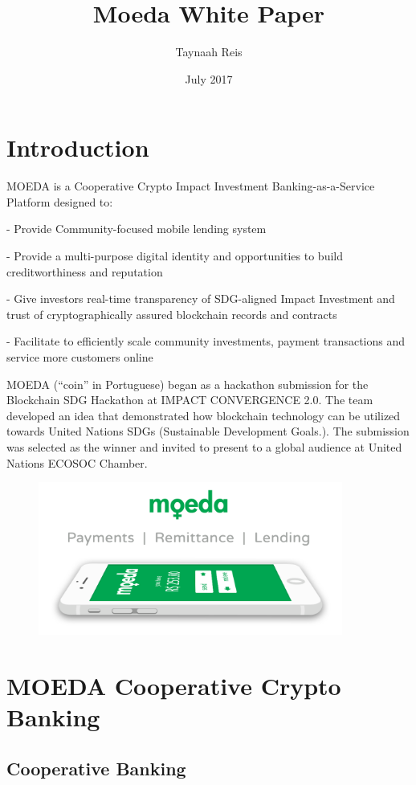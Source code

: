 \documentclass{article}
\title{Moeda White Paper}
\author{Taynaah Reis}
\date{July 2017}
\begin{document}
\maketitle

\section{Introduction}

MOEDA is a Cooperative Crypto Impact Investment Banking-as-a-Service Platform designed to:

- Provide Community-focused mobile lending system

- Provide a multi-purpose digital identity and opportunities to build creditworthiness and reputation

- Give investors real-time transparency of SDG-aligned Impact Investment and trust of cryptographically assured blockchain records and contracts

- Facilitate to efficiently scale community investments, payment transactions and service more customers online

MOEDA (“coin” in Portuguese) began as a hackathon submission for the Blockchain SDG Hackathon at IMPACT CONVERGENCE 2.0. The team developed an idea that demonstrated how blockchain technology can be utilized towards United Nations SDGs (Sustainable Development Goals.). The submission was selected as the winner and invited to present to a global audience at United Nations ECOSOC Chamber. 

\begin{figure}[h]
    \centering
    \includegraphics[width=10cm,keepaspectratio,]{mda}
   
\end{figure}

\section{MOEDA Cooperative Crypto Banking}

\subsection{Cooperative Banking}
\end{document}
